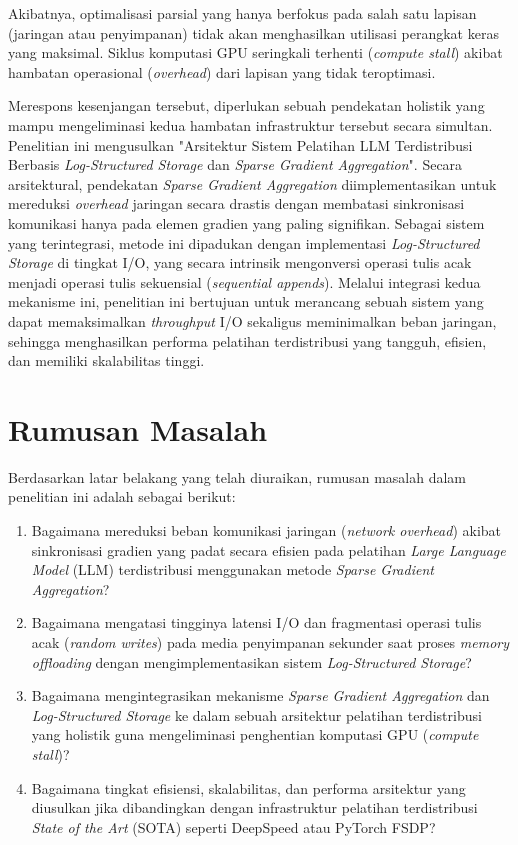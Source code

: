 Akibatnya, optimalisasi parsial yang hanya berfokus pada salah satu lapisan (jaringan atau penyimpanan) tidak akan menghasilkan utilisasi perangkat keras yang maksimal.
Siklus komputasi GPU seringkali terhenti (\textit{compute stall}) akibat hambatan operasional (\textit{overhead}) dari lapisan yang tidak teroptimasi.

Merespons kesenjangan tersebut, diperlukan sebuah pendekatan holistik yang mampu mengeliminasi kedua hambatan infrastruktur tersebut secara simultan.
Penelitian ini mengusulkan "Arsitektur Sistem Pelatihan LLM Terdistribusi Berbasis \textit{Log-Structured Storage} dan \textit{Sparse Gradient Aggregation}".
Secara arsitektural, pendekatan \textit{Sparse Gradient Aggregation} diimplementasikan untuk mereduksi \textit{overhead} jaringan secara drastis dengan membatasi sinkronisasi komunikasi hanya pada elemen gradien yang paling signifikan.
Sebagai sistem yang terintegrasi, metode ini dipadukan dengan implementasi \textit{Log-Structured Storage} di tingkat I/O, yang secara intrinsik mengonversi operasi tulis acak menjadi operasi tulis sekuensial (\textit{sequential appends}).
Melalui integrasi kedua mekanisme ini, penelitian ini bertujuan untuk merancang sebuah sistem yang dapat memaksimalkan \textit{throughput} I/O sekaligus meminimalkan beban jaringan, sehingga menghasilkan performa pelatihan terdistribusi yang tangguh, efisien, dan memiliki skalabilitas tinggi.

\section{Rumusan Masalah}

Berdasarkan latar belakang yang telah diuraikan, rumusan masalah dalam penelitian ini adalah sebagai berikut:
\begin{enumerate}
    \item Bagaimana mereduksi beban komunikasi jaringan (\textit{network overhead}) akibat sinkronisasi gradien yang padat secara efisien pada pelatihan \textit{Large Language Model} (LLM) terdistribusi menggunakan metode \textit{Sparse Gradient Aggregation}?
    \item Bagaimana mengatasi tingginya latensi I/O dan fragmentasi operasi tulis acak (\textit{random writes}) pada media penyimpanan sekunder saat proses \textit{memory offloading} dengan mengimplementasikan sistem \textit{Log-Structured Storage}?
    \item Bagaimana mengintegrasikan mekanisme \textit{Sparse Gradient Aggregation} dan \textit{Log-Structured Storage} ke dalam sebuah arsitektur pelatihan terdistribusi yang holistik guna mengeliminasi penghentian komputasi GPU (\textit{compute stall})?
    \item Bagaimana tingkat efisiensi, skalabilitas, dan performa arsitektur yang diusulkan jika dibandingkan dengan infrastruktur pelatihan terdistribusi \textit{State of the Art} (SOTA) seperti DeepSpeed atau PyTorch FSDP?
\end{enumerate}

